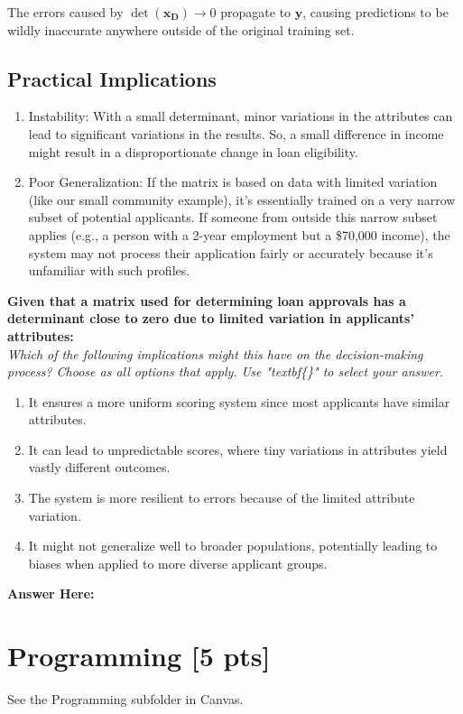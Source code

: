 \documentclass{article}
\begin{document}
The errors caused by $\det(\mathbf{x_D}) \rightarrow 0$ propagate to $\mathbf{y}$, causing predictions to be wildly inaccurate anywhere outside of the original training set.

\subsection*{Practical Implications}

\begin{enumerate}
    \item Instability: With a small determinant, minor variations in the attributes can lead to significant variations in the results. So, a small difference in income might result in a disproportionate change in loan eligibility.
    \item Poor Generalization: If the matrix is based on data with limited variation (like our small community example), it's essentially trained on a very narrow subset of potential applicants. If someone from outside this narrow subset applies (e.g., a person with a 2-year employment but a \$70,000 income), the system may not process their application fairly or accurately because it's unfamiliar with such profiles.
\end{enumerate}

\noindent
\textbf{Given that a matrix used for determining loan approvals has a determinant close to zero due to limited variation in applicants' attributes:} \\
\textit{Which of the following implications might this have on the decision-making process? Choose as all options that apply. Use "textbf\{\}" to select your answer.}
\begin{enumerate}[label=\Alph*)]
    \item It ensures a more uniform scoring system since most applicants have similar attributes.
    \item It can lead to unpredictable scores, where tiny variations in attributes yield vastly different outcomes.
    \item The system is more resilient to errors because of the limited attribute variation.
    \item It might not generalize well to broader populations, potentially leading to biases when applied to more diverse applicant groups.
\end{enumerate}
\textbf{Answer Here:}
\newpage

\section{Programming [5 pts]}
See the Programming subfolder in Canvas.
\newpage
\end{document}
